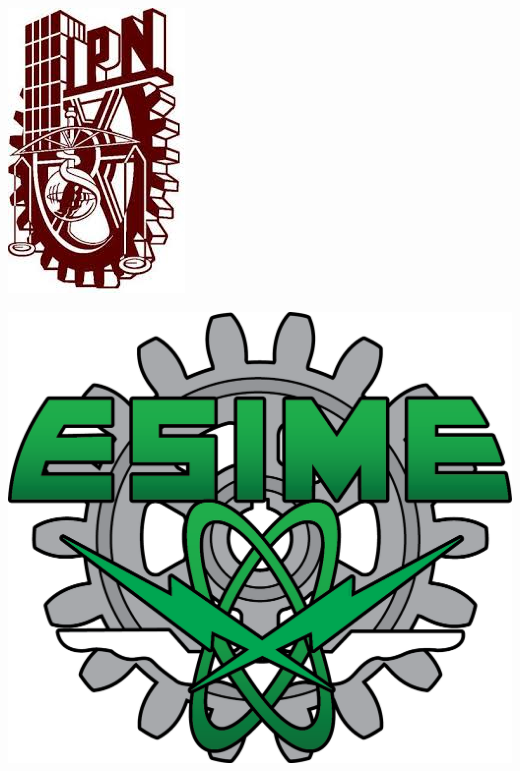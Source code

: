 \begin{center}																		%
\newcommand{\HRule}{\rule{\linewidth}{0.6mm}}									%
\begin{minipage}{0.48\textwidth} \begin{flushleft}
\includegraphics[scale = 0.25]{Tesis/Imagenes/IPN}
\end{flushleft}\end{minipage}
\begin{minipage}{0.48\textwidth} \begin{flushright}
\includegraphics[scale = 0.23]{Tesis/Imagenes/Esime_Logo_Modificado.png}
\end{flushright}\end{minipage}


\end{center}
